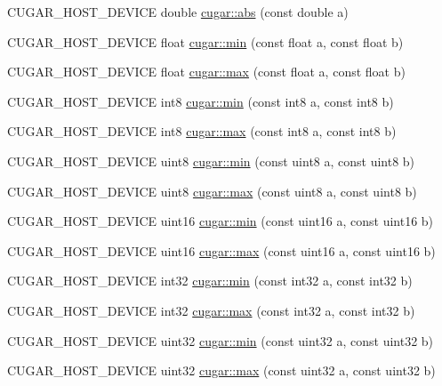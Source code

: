 \begin{DoxyCompactItemize}
\item 
C\+U\+G\+A\+R\+\_\+\+H\+O\+S\+T\+\_\+\+D\+E\+V\+I\+CE double \hyperlink{group___basic_ga6f625f0822c168a5fbea5dccd0a515fc}{cugar\+::abs} (const double a)
\item 
C\+U\+G\+A\+R\+\_\+\+H\+O\+S\+T\+\_\+\+D\+E\+V\+I\+CE float \hyperlink{group___basic_ga7359b06cac70a9ebdc0cec435a22dc78}{cugar\+::min} (const float a, const float b)
\item 
C\+U\+G\+A\+R\+\_\+\+H\+O\+S\+T\+\_\+\+D\+E\+V\+I\+CE float \hyperlink{group___basic_gacf2a4854f407fd49acbe6de7dd955fb1}{cugar\+::max} (const float a, const float b)
\item 
C\+U\+G\+A\+R\+\_\+\+H\+O\+S\+T\+\_\+\+D\+E\+V\+I\+CE int8 \hyperlink{group___basic_gac9bd069f8fb579f27655344e2a8eaafe}{cugar\+::min} (const int8 a, const int8 b)
\item 
C\+U\+G\+A\+R\+\_\+\+H\+O\+S\+T\+\_\+\+D\+E\+V\+I\+CE int8 \hyperlink{group___basic_ga4064b22dd9157ceb1c2bcdbfdad13fbd}{cugar\+::max} (const int8 a, const int8 b)
\item 
C\+U\+G\+A\+R\+\_\+\+H\+O\+S\+T\+\_\+\+D\+E\+V\+I\+CE uint8 \hyperlink{group___basic_ga07e60716a77447bddef733b3c77838a7}{cugar\+::min} (const uint8 a, const uint8 b)
\item 
C\+U\+G\+A\+R\+\_\+\+H\+O\+S\+T\+\_\+\+D\+E\+V\+I\+CE uint8 \hyperlink{group___basic_gafe1b5e565ab031c6a2fe4430777e0d64}{cugar\+::max} (const uint8 a, const uint8 b)
\item 
C\+U\+G\+A\+R\+\_\+\+H\+O\+S\+T\+\_\+\+D\+E\+V\+I\+CE uint16 \hyperlink{group___basic_gadac4763807d3e84119b991def668b96a}{cugar\+::min} (const uint16 a, const uint16 b)
\item 
C\+U\+G\+A\+R\+\_\+\+H\+O\+S\+T\+\_\+\+D\+E\+V\+I\+CE uint16 \hyperlink{group___basic_gad7f98145cf912b8c66a7675cd9cb5e18}{cugar\+::max} (const uint16 a, const uint16 b)
\item 
C\+U\+G\+A\+R\+\_\+\+H\+O\+S\+T\+\_\+\+D\+E\+V\+I\+CE int32 \hyperlink{group___basic_gac0bc43a4d8949143dc20b3116d5065e7}{cugar\+::min} (const int32 a, const int32 b)
\item 
C\+U\+G\+A\+R\+\_\+\+H\+O\+S\+T\+\_\+\+D\+E\+V\+I\+CE int32 \hyperlink{group___basic_ga4973552119d9d62f4c9db07d08dbc3d6}{cugar\+::max} (const int32 a, const int32 b)
\item 
C\+U\+G\+A\+R\+\_\+\+H\+O\+S\+T\+\_\+\+D\+E\+V\+I\+CE uint32 \hyperlink{group___basic_ga4b5fa5961733ee2ad393a6c581d07c5d}{cugar\+::min} (const uint32 a, const uint32 b)
\item 
C\+U\+G\+A\+R\+\_\+\+H\+O\+S\+T\+\_\+\+D\+E\+V\+I\+CE uint32 \hyperlink{group___basic_gaabae3013fbdf1d86ce652f218a7f2bb2}{cugar\+::max} (const uint32 a, const uint32 b)

\end{DoxyCompactItemize}
